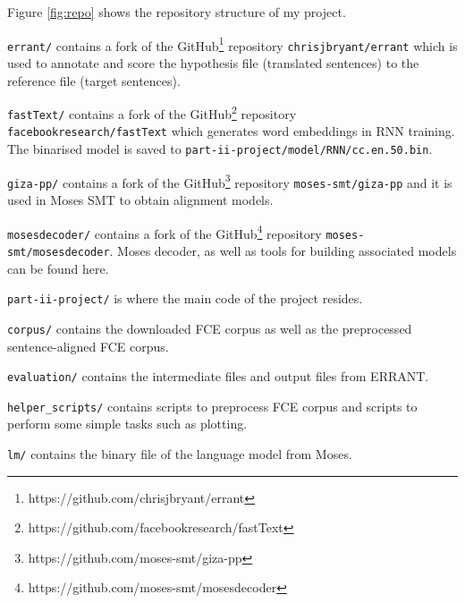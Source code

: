 \documentclass[12pt,a4paper,twoside,openright]{report}
\begin{document}
Figure \ref{fig:repo} shows the repository structure of my project. 

\texttt{errant/} contains a fork of the GitHub\footnote{https://github.com/chrisjbryant/errant} repository \texttt{chrisjbryant/errant}\cite{bryant-etal-2017-automatic}\cite{felice-etal-2016-automatic} which is used to annotate and score the hypothesis file (translated sentences) to the reference file (target sentences). 

\texttt{fastText/} contains a fork of the GitHub\footnote{https://github.com/facebookresearch/fastText} repository \texttt{facebookresearch/fastText}\cite{grave2018learning} which generates word embeddings in RNN training. The binarised model is saved to \texttt{part-ii-project/model/RNN/cc.en.50.bin}.

\texttt{giza-pp/} contains a fork of the GitHub\footnote{https://github.com/moses-smt/giza-pp} repository \texttt{moses-smt/giza-pp}\cite{giza_pp} and it is used in Moses SMT to obtain alignment models.

\texttt{mosesdecoder/} contains a fork of the GitHub\footnote{https://github.com/moses-smt/mosesdecoder} repository \texttt{moses-smt/mosesdecoder}\cite{moses}. Moses decoder, as well as tools for building associated models can be found here.

\texttt{part-ii-project/} is where the main code of the project resides.

\hfill\begin{minipage}{\dimexpr\textwidth-1cm}
    \texttt{corpus/} contains the downloaded FCE corpus as well as the preprocessed sentence-aligned FCE corpus.
\end{minipage}

\hfill\begin{minipage}{\dimexpr\textwidth-1cm}
    \texttt{evaluation/} contains the intermediate files and output files from ERRANT.
\end{minipage}

\hfill\begin{minipage}{\dimexpr\textwidth-1cm}
    \texttt{helper\_scripts/} contains scripts to preprocess FCE corpus and scripts to perform some simple tasks such as plotting.
\end{minipage}

\hfill\begin{minipage}{\dimexpr\textwidth-1cm}
    \texttt{lm/} contains the binary file of the language model from Moses.
\end{minipage}
\end{document}
